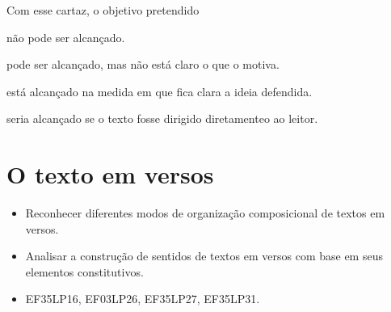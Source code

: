 
Com esse cartaz, o objetivo pretendido

\begin{escolha}
\item não pode ser alcançado.

\item pode ser alcançado, mas não está claro o que o motiva.

\item está alcançado na medida em que fica clara a ideia defendida.

\item seria alcançado se o texto fosse dirigido diretamenteo ao leitor.
\end{escolha}

\chapter{O texto em versos}



\begin{itemize}
  \item Reconhecer diferentes modos de organização composicional de
textos em versos.
  \item Analisar a construção de sentidos de textos em versos com base
em seus elementos constitutivos.
\end{itemize}


\begin{itemize}
\item EF35LP16, EF03LP26, EF35LP27, EF35LP31.
\end{itemize}


